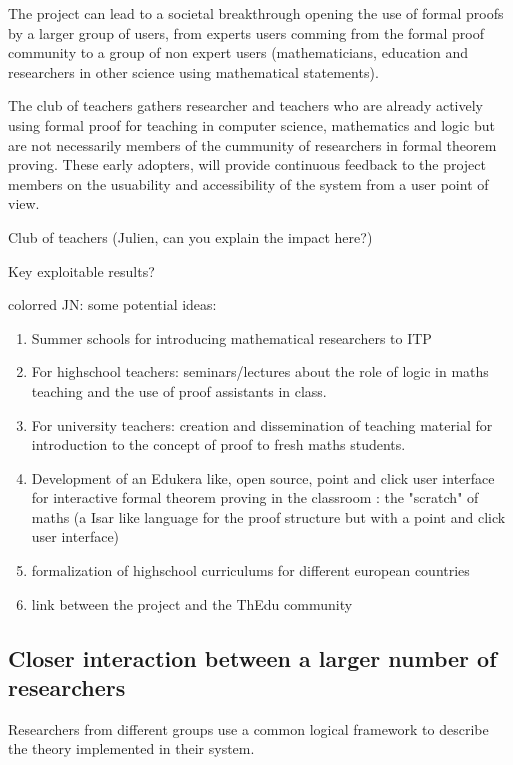 The project can lead to a societal breakthrough opening the use of formal proofs by a larger group of users, from experts users comming from the formal proof community  to a group of non expert users (mathematicians, education and researchers in other science using mathematical statements). 

The club of teachers gathers researcher and teachers who are already actively using formal proof for teaching in computer science, mathematics and logic but are not necessarily members of the cummunity of researchers in formal theorem proving. These early adopters, will provide continuous feedback to the project members on the usuability and accessibility of the system from a user point of view.


{\color{red} Club of teachers (Julien, can you explain the impact here?)}

{\color{red} Key exploitable results?}

{color{red} JN:  some potential ideas:}
\begin{enumerate}
\item Summer schools for introducing mathematical researchers to ITP
\item For highschool teachers: seminars/lectures about  the role of logic in maths teaching and the use of proof assistants in class.
\item For university teachers: creation and dissemination of teaching material for introduction to the concept of proof to fresh maths students.   
\item Development of an Edukera like, open source, point and click user interface for interactive formal theorem proving in the classroom : the "scratch" of maths  (a Isar like language for the proof structure but with a point and click user interface)
\item formalization of  highschool curriculums for different european countries
\item link between the project and the ThEdu community
\end{enumerate}




\subsection{Closer interaction between a larger number of researchers}

Researchers from different groups use a common logical framework to
describe the theory implemented in their system.


